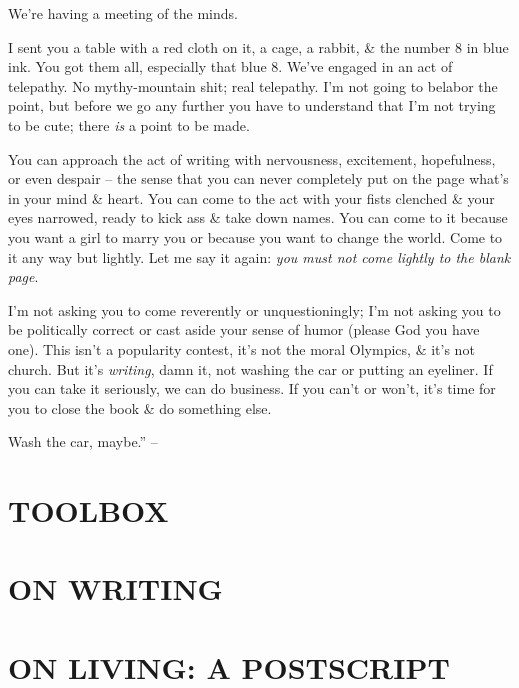 \documentclass{article}
\numberwithin{equation}{section}
\begin{document}
We're having a meeting of the minds.

I sent you a table with a red cloth on it, a cage, a rabbit, \& the number 8 in blue ink. You got them all, especially that blue 8. We've engaged in an act of telepathy. No mythy-mountain shit; real telepathy. I'm not going to belabor the point, but before we go any further you have to understand that I'm not trying to be cute; there \textit{is} a point to be made.

You can approach the act of writing with nervousness, excitement, hopefulness, or even despair -- the sense that you can never completely put on the page what's in your mind \& heart. You can come to the act with your fists clenched \& your eyes narrowed, ready to kick ass \& take down names. You can come to it because you want a girl to marry you or because you want to change the world. Come to it any way but lightly. Let me say it again: \textit{you must not come lightly to the blank page}.

I'm not asking you to come reverently or unquestioningly; I'm not asking you to be politically correct or cast aside your sense of humor (please God you have one). This isn't a popularity contest, it's not the moral Olympics, \& it's not church. But it's \textit{writing}, damn it, not washing the car or putting an eyeliner. If you can take it seriously, we can do business. If you can't or won't, it's time for you to close the book \& do something else.

Wash the car, maybe.'' -- \cite[pp. 83--85]{King2010}


\section{TOOLBOX}


\section{ON WRITING}


\section{ON LIVING: A POSTSCRIPT}
\end{document}
